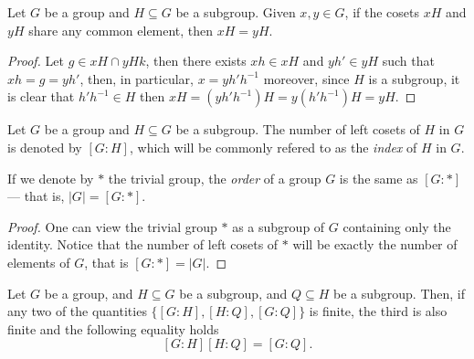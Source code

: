 \begin{corollary}
\label{cor:equal-cosets}
Let \(G\) be a group and \(H \subseteq G\) be a subgroup. Given \(x, y \in G\),
if the cosets \(x H\) and \(y H\) share any common element, then \(x H = y H\).
\end{corollary}

\begin{proof}
Let \(g \in xH \cap yHk\), then there exists \(x h \in xH\) and \(y h' \in yH\)
such that \(x h = g = y h'\), then, in particular, \(x = y h' h^{-1}\) moreover,
since \(H\) is a subgroup, it is clear that \(h' h^{-1} \in H\) then \(x H = (y
h' h^{-1})H = y(h' h^{-1})H = y H\).
\end{proof}

\begin{definition}[Index]
\label{def:grp-index}
Let \(G\) be a group and \(H \subseteq G\) be a subgroup. The number of left
cosets of \(H\) in \(G\) is denoted by \([G \colon H]\), which will be commonly
refered to as the \emph{index} of \(H\) in \(G\).
\end{definition}

\begin{corollary}
\label{cor:order-as-index}
If we denote by \(*\) the trivial group, the \emph{order} of a group
\(G\) is the same as \([G \colon *]\) --- that is, \(|G| = [G \colon *]\).
\end{corollary}

\begin{proof}
One can view the trivial group \(*\) as a subgroup of \(G\) containing only the
identity. Notice that the number of left cosets of \(*\) will be exactly the
number of elements of \(G\), that is \([G \colon *] = |G|\).
\end{proof}

\begin{proposition}
\label{prop:grp-index-subgroup}
Let \(G\) be a group, and \(H \subseteq G\) be a subgroup, and \(Q \subseteq H\)
be a subgroup. Then, if any two of the quantities \(\{[G \colon H], [H \colon
Q], [G \colon Q]\}\) is finite, the third is also finite and the following
equality holds
\[
  [G \colon H] [H \colon Q] = [G \colon Q].
\]
\end{proposition}

